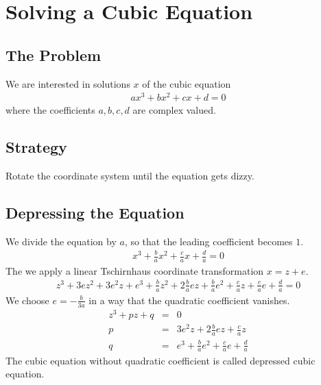 \documentclass[12pt,a4paper,twoside,openright,BCOR10mm,headsepline,titlepage,abstracton,chapterprefix,final]{scrreprt}
\begin{document}
\section{Solving a Cubic Equation}

\subsection{The Problem}
We are interested in solutions $x$ of the cubic equation
\begin{eqnarray}
 a x^3 + b x^2 + c x + d = 0
\end{eqnarray}
where the coefficients $a,b,c,d$ are complex valued.

\subsection{Strategy}
Rotate the coordinate system until the equation gets dizzy.

\subsection{Depressing the Equation}
We divide the equation by $a$, so that the leading coefficient becomes $1$.
\begin{eqnarray}
 x^3 + \frac{b}{a} x^2 + \frac{c}{a} x + \frac{d}{a} = 0
\end{eqnarray}
The we apply a linear Tschirnhaus coordinate transformation $x = z + e$.
\begin{eqnarray}
z^3 + 3 e z^2 + 3 e^2 z + e^3 +
\frac{b}{a} z^2 + 2 \frac{b}{a} ez + \frac{b}{a} e^2 +
\frac{c}{a} z + \frac{c}{a} e +
\frac{d}{a}
= 0
\end{eqnarray}
We choose $e = -\frac{b}{3a}$ in a way that the quadratic coefficient vanishes.
\begin{eqnarray}
z^3 + p z + q &=& 0 \label{eq:cubic_depressed}
\\
p &=& 3 e^2 z + 2 \frac{b}{a} ez + \frac{c}{a} z
\\
q &=& e^3 + \frac{b}{a} e^2 + \frac{c}{a} e + \frac{d}{a}
\end{eqnarray}
The cubic equation without quadratic coefficient is called depressed cubic equation.
\end{document}
